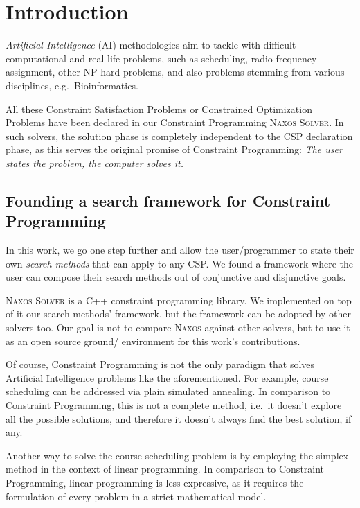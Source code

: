 \documentclass{ws-ijait}
\begin{document}


\section{Introduction}

\emph{Artificial Intelligence} (AI) methodologies aim to
tackle with difficult computational and real life problems,
such as scheduling,\cite{Pinedo2012} radio frequency
assignment,\cite{Cabon1999} other NP-hard problems, and also
problems stemming from various disciplines, e.g.\ 
Bioinformatics.\cite{Barahona2011}

All these Constraint Satisfaction Problems or Constrained
Optimization Problems have been declared in our Constraint
Programming \textsc{Naxos Solver}.\cite{Naxos} In such
solvers, the solution phase is completely independent to the
CSP declaration phase, as this serves the original promise
of Constraint Programming: \emph{The user states the
problem, the computer solves it.}\cite{Freuder2014}

\subsection{Founding a search framework for Constraint
            Programming}

In this work, we go one step further and allow the
user\slash programmer to state their own \emph{search
methods} that can apply to any CSP. We found a framework
where the user can compose their search methods out of
conjunctive and disjunctive goals.

\textsc{Naxos Solver} is a C++ constraint programming
library. We implemented on top of it our search methods'
framework, but the framework can be adopted by other solvers
too. Our goal is not to compare \textsc{Naxos} against other
solvers, but to use it as an open source ground\slash
environment for this work's contributions.

Of course, Constraint Programming is not the only paradigm
that solves Artificial Intelligence problems like the
aforementioned. For example, course scheduling can be
addressed via plain simulated annealing.\cite{Zhang2010} In
comparison to Constraint Programming, this is not a complete
method, i.e.\ it doesn't explore all the possible solutions,
and therefore it doesn't always find the best solution, if
any.

Another way to solve the course scheduling problem is by
employing the simplex method in the context of linear
programming.\cite{Burke2010} In comparison to Constraint
Programming, linear programming is less expressive, as it
requires the formulation of every problem in a strict
mathematical model.\cite{Vanderbei2014}
\end{document}
